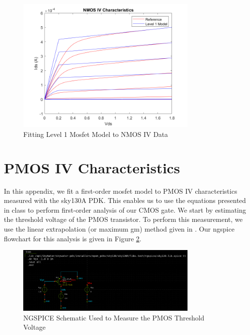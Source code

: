 \documentclass[fleqn]{article}
\begin{document}
	\begin{figure}[H]
		\centerline{\includegraphics[width=0.8\textwidth]{nmos_iv_fit.png}}
		\caption{Fitting Level 1 Mosfet Model to NMOS IV Data}
		\label{fig::nmos_iv_fit}
	\end{figure}	
	
	\pagebreak
	\section{PMOS IV Characteristics}
	\label{appendix::pmos_iv_characteristics}
	
	In this appendix, we fit a first-order mosfet model to PMOS IV characteristics measured with the sky130A PDK. This enables us to use the equations presented in class to perform first-order analysis of our CMOS gate. We start by estimating the threshold voltage of the PMOS transistor. To perform this measurement, we use the linear extrapolation (or maximum gm) method given in \cite{cmos_vlsi_design}. Our ngspice flowchart for this analysis is given in Figure \ref{fig::pmos_vt_meas_schem}.
	
	\begin{figure}[H]
		\centerline{\includegraphics[width=0.8\textwidth]{pmos_vt_meas_schem.png}}
		\caption{NGSPICE Schematic Used to Measure the PMOS Threshold Voltage}
		\label{fig::pmos_vt_meas_schem}
	\end{figure}
	
\end{document}
